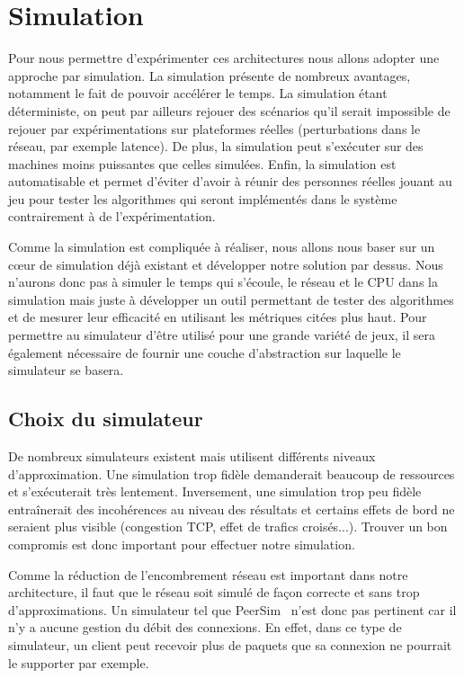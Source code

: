 \section{Simulation}
Pour nous permettre d'expérimenter ces architectures nous allons adopter une approche par simulation.
La simulation présente de nombreux avantages, notamment le fait de pouvoir accélérer le temps.
La simulation étant déterministe, on peut par ailleurs rejouer des scénarios qu'il serait impossible de rejouer par expérimentations sur plateformes réelles (perturbations dans le réseau, par exemple latence).
De plus, la simulation peut s'exécuter sur des machines moins puissantes que celles simulées.
Enfin, la simulation est automatisable et permet d'éviter d'avoir à réunir des personnes réelles jouant au jeu pour tester les algorithmes qui seront implémentés dans le système contrairement à de l'expérimentation.

Comme la simulation est compliquée à réaliser, nous allons nous baser sur un c\oe{}ur de simulation déjà existant et développer notre solution par dessus.
Nous n'aurons donc pas à simuler le temps qui s'écoule, le réseau et le CPU dans la simulation mais juste à développer un outil permettant de tester des algorithmes et de mesurer leur efficacité en utilisant les métriques citées plus haut.
Pour permettre au simulateur d'être utilisé pour une grande variété de jeux, il sera également nécessaire de fournir une couche d'abstraction sur laquelle le simulateur se basera.

\subsection{Choix du simulateur}
De nombreux simulateurs existent mais utilisent différents niveaux d'approximation.
Une simulation trop fidèle demanderait beaucoup de ressources et s'exécuterait très lentement.
Inversement, une simulation trop peu fidèle entraînerait des incohérences au niveau des résultats et certains effets de bord ne seraient plus visible (congestion TCP, effet de trafics croisés...).
Trouver un bon compromis est donc important pour effectuer notre simulation.

Comme la réduction de l'encombrement réseau est important dans notre architecture, il faut que le réseau soit simulé de façon correcte et sans trop d'approximations.
Un simulateur tel que PeerSim~\cite{peersim} n'est donc pas pertinent car il n'y a aucune gestion du débit des connexions.
En effet, dans ce type de simulateur, un client peut recevoir plus de paquets que sa connexion ne pourrait le supporter par exemple.

